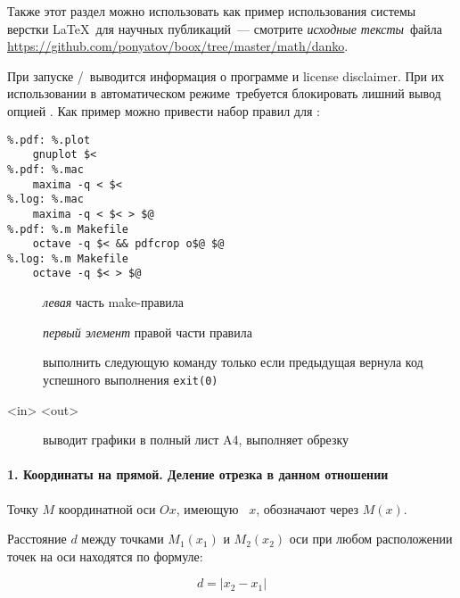 \bigskip
Также этот раздел можно использовать как пример использования системы верстки
\LaTeX\ для научных публикаций\ --- смотрите \emph{исходные тексты}\ файла
\url{https://github.com/ponyatov/boox/tree/master/math/danko}.


При запуске \maxima/\octave\ выводится информация о программе и license
disclaimer. При их использовании в автоматическом режиме\ требуется блокировать лишний вывод опцией . Как
пример можно привести набор правил для :

\begin{verbatim}
%.pdf: %.plot
    gnuplot $<
%.pdf: %.mac
    maxima -q < $<
%.log: %.mac
    maxima -q < $< > $@
%.pdf: %.m Makefile
    octave -q $< && pdfcrop o$@ $@
%.log: %.m Makefile
    octave -q $< > $@
\end{verbatim}

\begin{description}
\item[] \emph{левая} часть make-правила
\item[\var{\$<}] \emph{первый элемент} правой части правила
\item[\var{\&\&}] выполнить следующую команду только если предыдущая вернула код
успешного выполнения \verb|exit(0)|
\item[ <in> <out>]  выводит графики в полный
лист A4,  выполняет обрезку
\end{description}

\secdown


\paragraph{1. Координаты на прямой. Деление отрезка в данном отношении}

Точку $M$ координатной оси $Ox$, имеющую \ $x$,
обозначают через $M(x)$.

Расстояние $d$ между точками $M_{1}(x_{1})$ и $M_{2}(x_{2})$ оси при любом
расположении точек на оси находятся по формуле:

\begin{equation}\label{danko1}
d=|x_{2}-x_{1}|
\end{equation}

